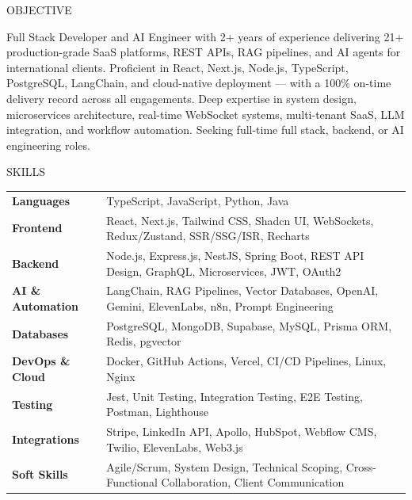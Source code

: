 \documentclass{resume}
\begin{document}

\begin{rSection}{OBJECTIVE}

{Full Stack Developer and AI Engineer with 2+ years of experience delivering 21+ production-grade SaaS platforms, REST APIs, RAG pipelines, and AI agents for international clients. Proficient in React, Next.js, Node.js, TypeScript, PostgreSQL, LangChain, and cloud-native deployment — with a 100\% on-time delivery record across all engagements. Deep expertise in system design, microservices architecture, real-time WebSocket systems, multi-tenant SaaS, LLM integration, and workflow automation. Seeking full-time full stack, backend, or AI engineering roles.}

\end{rSection}


\begin{rSection}{SKILLS}

\begin{tabular}{ @{} >{\bfseries}l @{\hspace{6ex}} l }
Languages        & TypeScript, JavaScript, Python, Java \\
Frontend         & React, Next.js, Tailwind CSS, Shadcn UI, WebSockets, Redux/Zustand, SSR/SSG/ISR, Recharts \\
Backend          & Node.js, Express.js, NestJS, Spring Boot, REST API Design, GraphQL, Microservices, JWT, OAuth2 \\
AI \& Automation & LangChain, RAG Pipelines, Vector Databases, OpenAI, Gemini, ElevenLabs, n8n, Prompt Engineering \\
Databases        & PostgreSQL, MongoDB, Supabase, MySQL, Prisma ORM, Redis, pgvector \\
DevOps \& Cloud  & Docker, GitHub Actions, Vercel, CI/CD Pipelines, Linux, Nginx \\
Testing          & Jest, Unit Testing, Integration Testing, E2E Testing, Postman, Lighthouse \\
Integrations     & Stripe, LinkedIn API, Apollo, HubSpot, Webflow CMS, Twilio, ElevenLabs, Web3.js \\
Soft Skills      & Agile/Scrum, System Design, Technical Scoping, Cross-Functional Collaboration, Client Communication \\
\end{tabular}\\

\end{rSection}
\end{document}
